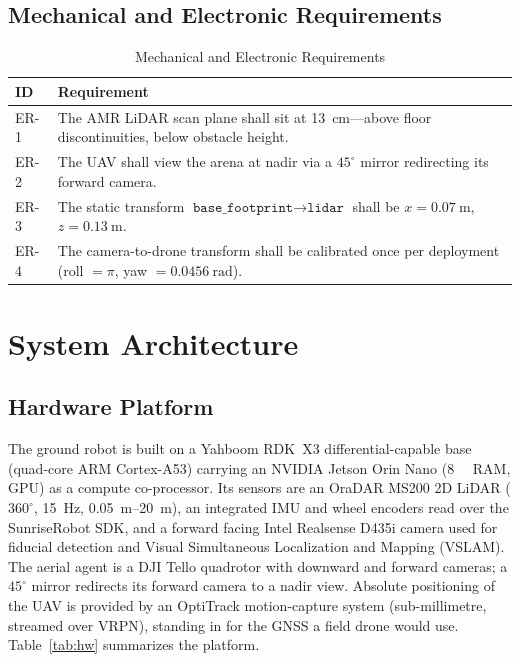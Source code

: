 \documentclass[conference]{IEEEtran}
\begin{document}
\subsection{Mechanical and Electronic Requirements}
\begin{table}[t]
\caption{Mechanical and Electronic Requirements}
\label{tab:er}
\centering
\begin{tabular}{@{}p{}p{}@{}}
\toprule
\textbf{ID} & \textbf{Requirement} \\
\midrule
ER-1 & The AMR LiDAR scan plane shall sit at \SI{13}{\centi\meter}---above floor discontinuities, below obstacle height. \\
ER-2 & The UAV shall view the arena at nadir via a $45^\circ$ mirror redirecting its forward camera. \\
ER-3 & The static transform $\texttt{base\_footprint}\to\texttt{lidar}$ shall be $x=\SI{0.07}{\meter}$, $z=\SI{0.13}{\meter}$. \\
ER-4 & The camera-to-drone transform shall be calibrated once per deployment (roll $=\pi$, yaw $=\SI{0.0456}{\radian}$). \\
\bottomrule
\end{tabular}
\end{table}

\section{System Architecture}
\label{sec:architecture}

\subsection{Hardware Platform}
The ground robot is built on a Yahboom RDK~X3 differential-capable base
(quad-core ARM Cortex-A53) carrying an NVIDIA Jetson Orin Nano (\SI{8}{\giga\byte}
RAM, GPU) as a compute co-processor. Its sensors are an OraDAR MS200 2D LiDAR
($360^\circ$, \SI{15}{\hertz}, \SIrange{0.05}{20}{\meter}), an integrated IMU and
wheel encoders read over the SunriseRobot SDK, and a forward facing Intel Realsense D435i camera used for
fiducial detection and Visual Simultaneous Localization and Mapping (VSLAM). The aerial agent is a DJI Tello quadrotor with downward and
forward cameras; a $45^\circ$ mirror redirects its forward camera to a nadir
view. Absolute positioning of the UAV is provided by an OptiTrack motion-capture
system (sub-millimetre, streamed over VRPN), standing in for the GNSS a field
drone would use. Table~\ref{tab:hw} summarizes the platform.
\end{document}
